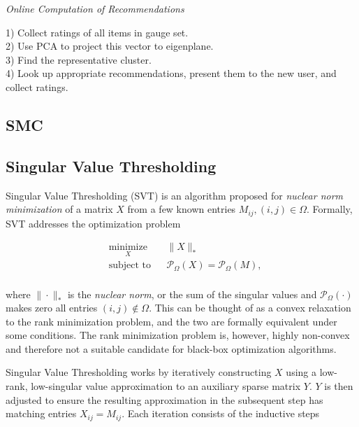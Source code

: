 \documentclass{article} %
\begin{document}
 \textit{Online Computation of Recommendations}

1) Collect ratings of all items in gauge set.\\
2) Use PCA to project this vector to eigenplane.\\
3) Find the representative cluster.\\
4) Look up appropriate recommendations, present them to the new user, and collect ratings.




\subsection{SMC}
%

\subsection{Singular Value Thresholding}

Singular Value Thresholding (SVT) \cite{cai2010singular} is an
algorithm proposed for \emph{nuclear norm minimization} of a matrix
$X$ from a few known entries $M_{ij}, (i,j) \in \Omega$. Formally, SVT
addresses the optimization problem

\begin{equation*}
\begin{aligned}
  & \underset{X}{\text{minimize}} & & \|X\|_{*} \\
  & \text{subject to}             & & \mathcal{P}_\Omega (X) =
  \mathcal{P}_\Omega (M), \\
\end{aligned}
\end{equation*}

where $\|\cdot\|_{*}$ is the \emph{nuclear norm}, or the sum of the
singular values and $\mathcal{P}_\Omega (\cdot)$ makes zero all
entries $(i, j) \notin \Omega$. This can be thought of as a convex
relaxation to the rank minimization problem, and the two are formally
equivalent under some conditions. The rank minimization problem is,
however, highly non-convex and therefore not a suitable candidate for
black-box optimization algorithms.

Singular Value Thresholding works by iteratively constructing $X$
using a low-rank, low-singular value approximation to an auxiliary
sparse matrix $Y$. $Y$ is then adjusted to ensure the resulting
approximation in the subsequent step has matching entries
$X_{ij} = M_{ij}$. Each iteration consists of the inductive steps
\end{document}
